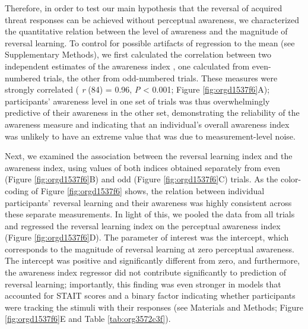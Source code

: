 \documentclass[12pt]{article}
\begin{document}
Therefore, in order to test our main hypothesis that the reversal of
acquired threat responses can be achieved without perceptual awareness,
we characterized the quantitative relation between the level of
awareness and the magnitude of reversal learning. To control for
possible artifacts of regression to the mean (see Supplementary
Methods), we first calculated the correlation between two independent
estimates of the awareness index \cite{Shanks2016}, one calculated
from even-numbered trials, the other from odd-numbered trials. These
measures were strongly correlated (
\emph{r} (84) = 0.96, \emph{P} < 0.001; Figure
\ref{fig:orgd1537f6}A); participants' awareness level in one set of trials
was thus overwhelmingly predictive of their awareness in the other set,
demonstrating the reliability of the awareness measure and indicating
that an individual's overall awareness index was unlikely to have an
extreme value that was due to measurement-level noise.

Next, we examined the association between the reversal learning index
and the awareness index, using values of both indices obtained
separately from even (Figure \ref{fig:orgd1537f6}B) and odd (Figure
\ref{fig:orgd1537f6}C) trials. As the color-coding of Figure
\ref{fig:orgd1537f6} shows, the relation between individual participants'
reversal learning and their awareness was highly consistent across these
separate measurements. In light of this, we pooled the data from all
trials and regressed the reversal learning index on the perceptual
awareness index (Figure \ref{fig:orgd1537f6}D). The parameter of interest
was the intercept, which corresponds to the magnitude of reversal
learning at zero perceptual awareness. The intercept was positive and
significantly different from zero, and furthermore, the awareness index
regressor did not contribute significantly to prediction of reversal
learning; importantly, this finding was even stronger in models that
accounted for STAIT scores and a binary factor indicating whether
participants were tracking the stimuli with their responses (see
Materials and Methods; Figure \ref{fig:orgd1537f6}E and Table
\ref{tab:org3572c3f}).
\end{document}
